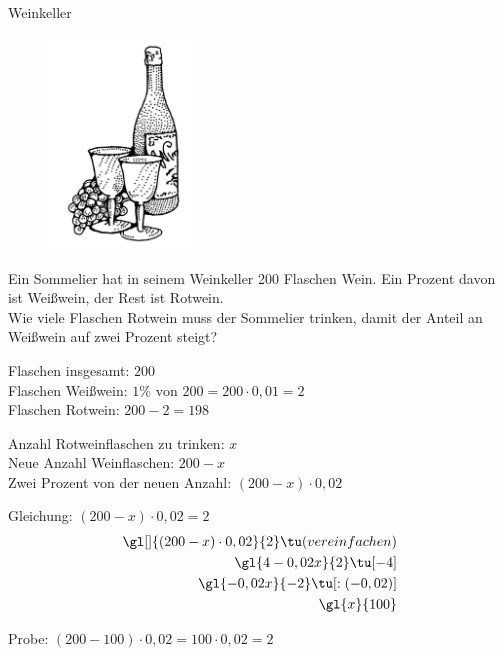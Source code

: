 \documentclass[12pt,a5paper,landscape]{scrartcl}
\begin{document}
\leereKarte

\begin{karte3}{Weinkeller}
	\begin{figure}
	\includegraphics[width=4cm]{7.4-LT-Abb_Wein}
	\end{figure}

	Ein Sommelier hat in seinem Weinkeller 200 Flaschen Wein. Ein Prozent davon ist Weißwein, der Rest ist Rotwein.\\[1em]
	
	Wie viele Flaschen Rotwein muss der Sommelier trinken, damit der Anteil an Weißwein auf zwei Prozent steigt?
	
\end{karte3}

\begin{loesungskarte}
	\begin{multicols}{2}\small
		Flaschen insgesamt: $200$ \\
		Flaschen Weißwein: $1\%\text{ von }200 = 200\cdot 0,01 = 2$ \\
		Flaschen Rotwein: $200-2 = 198$
		
		Anzahl Rotweinflaschen zu trinken: $x$ \\
		Neue Anzahl Weinflaschen: $200-x$ \\
		Zwei Prozent von der neuen Anzahl: $(200-x)\cdot 0,02$
	\end{multicols}

	Gleichung: $(200-x)\cdot 0,02 = 2$
	\begin{alignat*}{3}
		\gl[]{(200-x)\cdot 0,02}{2} \tu(vereinfachen) \\
		\gl{4 - 0,02x}{2} \tu[-4] \\
		\gl{-0,02x}{-2} \tu[:(-0,02)] \\
		\gl{x}{100}
	\end{alignat*}
	
	Probe: $(200-100)\cdot 0,02 = 100\cdot 0,02 = 2$
\end{loesungskarte}
\end{document}
